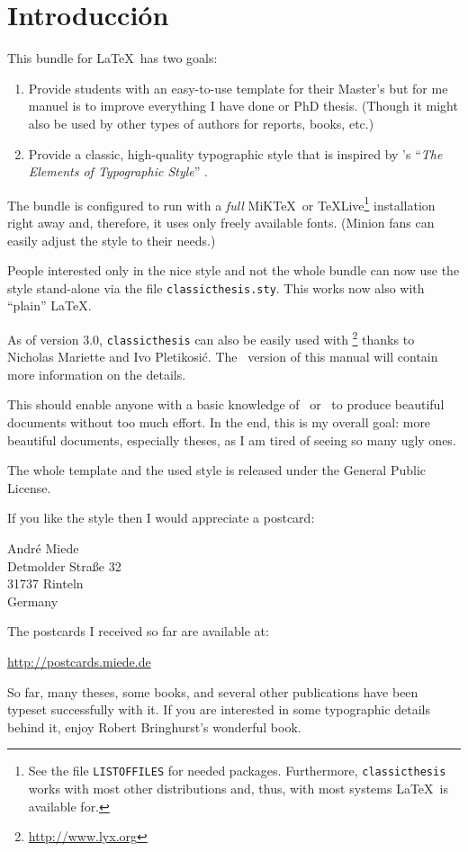 \chapter{Introducción}\label{ch:introduction}
This bundle for \LaTeX\ has two goals:
\begin{enumerate}
    \item Provide students with an easy-to-use template for their
    Master's but for me manuel is to improve everything I have done
    or PhD thesis. (Though it might also be used by other types of
    authors
    for reports, books, etc.)
    \item Provide a classic, high-quality typographic style that is
    inspired by \citeauthor{bringhurst:2002}'s ``\emph{The Elements of
    Typographic Style}'' \citep{bringhurst:2002}.
    \marginpar{\myTitle \myVersion}
\end{enumerate}
The bundle is configured to run with a \emph{full} 
MiK\TeX\ or \TeX Live\footnote{See the file \texttt{LISTOFFILES} for
needed packages. Furthermore, \texttt{classicthesis} 
works with most other distributions and, thus, with most systems 
\LaTeX\ is available for.} 
installation right away and, therefore, it uses only freely available 
fonts. (Minion fans can easily adjust the style to their needs.)

People interested only in the nice style and not the whole bundle can
now use the style stand-alone via the file \texttt{classicthesis.sty}.
This works now also with ``plain'' \LaTeX.

As of version 3.0, \texttt{classicthesis} can also be easily used with 
\mLyX\footnote{\url{http://www.lyx.org}} thanks to Nicholas Mariette 
and Ivo Pletikosi\'c. The \mLyX\ version of this manual will contain
more information on the details.

This should enable anyone with a basic knowledge of \LaTeXe\ or \mLyX\ to
produce beautiful documents without too much effort. In the end, this
is my overall goal: more beautiful documents, especially theses, as I
am tired of seeing so many ugly ones.

The whole template and the used style is released under the
 General Public License. 

If you like the style then I would appreciate a postcard:
\begin{center}
 André Miede \\
 Detmolder Straße 32 \\
 31737 Rinteln \\
 Germany
\end{center}
The postcards I received so far are available at:
\begin{center}
 \url{http://postcards.miede.de}
\end{center}
So far, many theses, some books, and several other publications have 
been typeset successfully with it. If you are interested in some
typographic details behind it, enjoy Robert Bringhurst's wonderful book.

